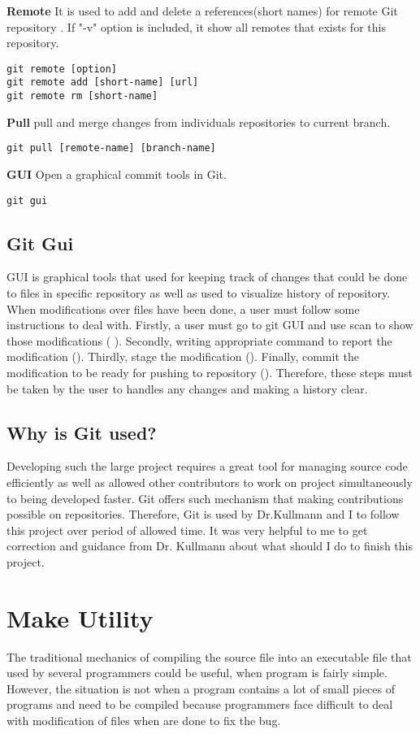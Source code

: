 \documentclass[11pt]{report}
\begin{document}
\textbf{Remote} It is used to add and delete a  references(short names) for remote Git repository . If "-v" option is included, it show all remotes that exists for this repository.
\begin{verbatim}
git remote [option]
git remote add [short-name] [url]
git remote rm [short-name]
\end{verbatim}

\textbf{Pull} pull and merge changes from individuals repositories to current branch.
\begin{verbatim}
git pull [remote-name] [branch-name]
\end{verbatim}

\textbf{GUI} Open a graphical commit tools in Git.
\begin{verbatim}
git gui
\end{verbatim}


\subsection{Git Gui}
\label{subsec: gitgui}
GUI is graphical tools that used for keeping track of changes that could be done to files in specific repository as well as used to visualize history of repository. When modifications over files have been done, a user must follow some instructions to deal with. Firstly, a user must go to git GUI and use scan to show those modifications ( ). Secondly, writing appropriate command to report the modification (). Thirdly, stage the modification (). Finally, commit the modification to be ready for pushing to repository (). Therefore, these steps must be taken by the user to handles any changes and making a history clear.


\subsection{Why is Git used?}
\label{subsec: why git}
Developing such the large project requires a great tool for managing source code efficiently as well as allowed other contributors to work on project simultaneously to being developed faster. Git offers such mechanism that making contributions possible on repositories. Therefore, Git is used by Dr.Kullmann and I to follow this project over period of allowed time. It was very helpful to me to get correction and guidance from Dr. Kullmann about what should I do to finish this project.

\section{Make Utility}
\label{sec: Make}
The traditional mechanics of compiling the source file into an executable file that used by several programmers could be useful, when program is fairly simple. However, the situation is not when a program contains a lot of small pieces of programs and need to be compiled because programmers face difficult to deal with modification of files when are done to fix the bug.
\end{document}
